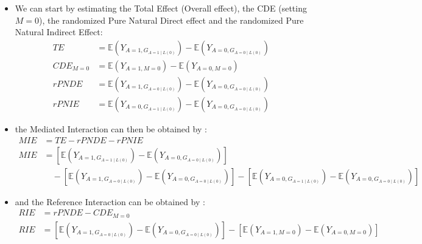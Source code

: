 \documentclass[
]{book}
\providecommand{\tightlist}{%
  \setlength{\itemsep}{0pt}\setlength{\parskip}{0pt}}
\begin{document}
\begin{itemize}
\tightlist
\item
  We can start by estimating the Total Effect (Overall effect), the CDE (setting \(M=0\)), the randomized Pure Natural Direct effect and the randomized Pure Natural Indirect Effect:
  \begin{align*}
  TE &= \mathbb{E}\left(Y_{A=1,G_{A=1\mid L(0)}} \right) - \mathbb{E}\left(Y_{A=0,G_{A=0\mid L(0)}} \right) \\
  CDE_{M=0} &=\mathbb{E}\left(Y_{A=1,M=0} \right) - \mathbb{E}\left(Y_{A=0,M=0} \right) \\
  rPNDE &= \mathbb{E}\left(Y_{A=1,G_{A=0\mid L(0)}} \right) - \mathbb{E}\left(Y_{A=0,G_{A=0\mid L(0)}} \right) \\
  rPNIE &= \mathbb{E}\left(Y_{A=0,G_{A=1\mid L(0)}} \right) - \mathbb{E}\left(Y_{A=0,G_{A=0\mid L(0)}} \right)
    \end{align*}
\item
  the Mediated Interaction can then be obtained by :
  \begin{align*}
  MIE &= TE - rPNDE - rPNIE \\
  MIE &= \left[ \mathbb{E}\left(Y_{A=1,G_{A=1\mid L(0)}} \right) - \mathbb{E}\left(Y_{A=0,G_{A=0\mid L(0)}} \right) \right] \\
    & \quad - \left[\mathbb{E}\left(Y_{A=1,G_{A=0\mid L(0)}} \right) - \mathbb{E}\left(Y_{A=0,G_{A=0\mid L(0)}} \right) \right] - \left[ \mathbb{E}\left(Y_{A=0,G_{A=1\mid L(0)}} \right) - \mathbb{E}\left(Y_{A=0,G_{A=0\mid L(0)}} \right)\right]
    \end{align*}
\item
  and the Reference Interaction can be obtained by :
  \begin{align*}
  RIE &= rPNDE - CDE_{M=0} \\
  RIE &= \left[\mathbb{E}\left(Y_{A=1,G_{A=0\mid L(0)}} \right) - \mathbb{E}\left(Y_{A=0,G_{A=0\mid L(0)}} \right) \right] - \left[ \mathbb{E}\left(Y_{A=1,M=0} \right) - \mathbb{E}\left(Y_{A=0,M=0} \right) \right]
    \end{align*}
\end{itemize}
\end{document}
